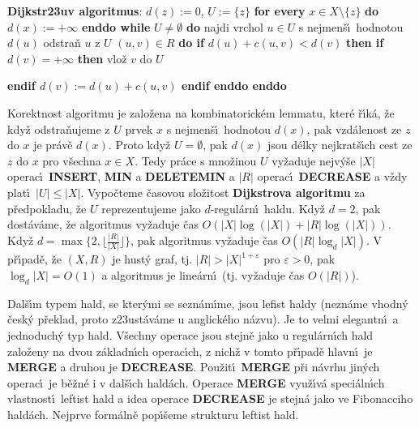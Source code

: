 {\bf Dijkstr\accent23uv algoritmus}:\newline 
$d(z):=0$, $U:=\{z\}$\newline 
{\bf for every} $x\in X\setminus \{z\}$ {\bf do} $d(x):=+\infty$ {\bf enddo\newline 
while} $U\ne\emptyset$ {\bf do\newline 
\phantom{{\rm ---}}}najdi vrchol $u\in U$ s nejmen\v s\'\i\ hodnotou $
d(u)$\newline 
\phantom{---}odstra\v n $u$ z $U$\newline 
\phantom{---}{\bf for every} $(u,v)\in R$ {\bf do \newline 
\phantom{{\rm ------}}if} $d(u)+c(u,v)<d(v)$ {\bf then\newline 
\phantom{{\rm ---------}}if} $d(v)=+\infty$ {\bf then} vlo\v z $v$ do $
U$ {\bf endif\newline 
\phantom{{\rm ---------}}$d(v):=d(u)+c(u,v)$\newline 
\phantom{{\rm ------}}endif\newline 
\phantom{{\rm ---}}enddo\newline 
enddo
\bigskip

}\flushpar Korektnost algoritmu je zalo\v zena na kombinatorick\'em 
lemmatu, kter\'e \v r\'\i k\'a, \v ze kdy\v z odstra\-\v nuje\-me z $
U$ prvek $x$ s 
nejmen\v s\'\i\ hodnotou $d(x)$, pak vzd\'alenost ze $z$ do $x$ je pr\'av\v e 
$d(x)$. Proto kdy\v z $U=\emptyset$, pak $d(x)$ jsou d\'elky nejkrat\v s\'\i ch cest ze 
$z$ do $x$ pro v\v sechna $x\in X$. Tedy pr\'ace s mno\v zinou $U$ vy\v zaduje 
nejv\'y\v se $|X|$ operac\'\i\ {\bf INSERT}, {\bf MIN} a {\bf DELETEMIN} a $
|R|$ operac\'\i\ 
{\bf DECREASE} a v\v zdy plat\'\i\ $|U|\le |X|$. Vypo\v cteme \v casovou slo\v zitost 
{\bf Dijkstrova algoritmu} za p\v redpokladu, \v ze $U$ reprezentujeme jako $
d$-regul\'arn\'\i\ 
haldu. Kdy\v z $d=2$, pak dost\'av\'ame, \v ze algoritmus vy\v zaduje \v cas 
$O(|X|\log(|X|)+|R|\log(|X|))$. Kdy\v z $d=\max\{2,\lfloor\frac {
|R|}{|X|}\rfloor \}$, pak algoritmus 
vy\v zaduje \v cas $O(|R|\log_d|X|)$. V p\v r\'\i pad\v e, \v ze $
(X,R)$ je hust\'y graf, 
tj. $|R|>|X|^{1+\varepsilon}$ pro $\varepsilon >0$, pak $\log_d|X
|=O(1)$ a algoritmus 
je line\'arn\'\i\ (tj. vy\v zaduje \v cas $O(|R|)$).
\bigskip
 
\centerline{}
\medskip

\flushpar Dal\v s\'\i m typem hald, se kter\'ymi se sezn\'am\'\i me, jsou lefist 
haldy (nezn\'ame vhodn\'y \v cesk\'y p\v reklad, proto z\accent23ust\'av\'ame 
u anglick\'eho n\'azvu). Je to velmi elegantn\'\i\ a jednoduch\'y typ 
hald. V\v sechny operace jsou stejn\v e jako u regul\'arn\'\i ch hald 
zalo\v zeny na 
dvou z\'akladn\'\i ch operac\'\i ch, z nich\v z v tomto p\v r\'\i pad\v e hlavn\'\i\ je {\bf MERGE} a  
druhou je {\bf DECREASE}. Pou\v zit\'\i\ {\bf MERGE }
p\v ri n\'avrhu jin\'ych operac\'\i\ je b\v e\v zn\'e i v dal\v s\'\i ch hald\'ach. 
Operace {\bf MERGE} vyu\v z\'\i v\'a speci\'aln\'\i ch vlastnost\'\i\ leftist 
hald a idea operace {\bf DECREASE} je stejn\'a jako ve 
Fibonacciho hald\'ach. Nejprve form\'aln\v e pop\'\i\v seme strukturu 
leftist hald. 
\medskip

